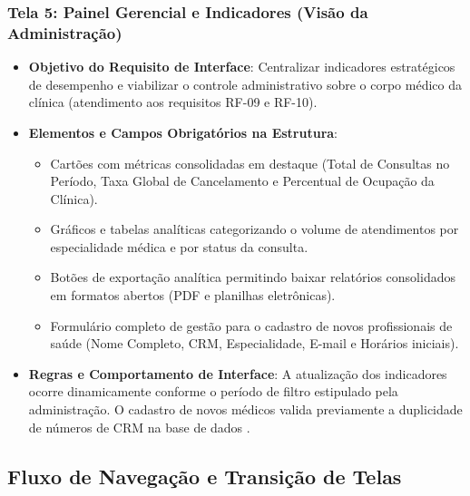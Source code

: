 \subsubsection{Tela 5: Painel Gerencial e Indicadores (Visão da Administração)}
\begin{itemize}
    \item \textbf{Objetivo do Requisito de Interface}: Centralizar indicadores estratégicos de desempenho e viabilizar o controle administrativo sobre o corpo médico da clínica (atendimento aos requisitos RF-09 e RF-10).
    \item \textbf{Elementos e Campos Obrigatórios na Estrutura}:
    \begin{itemize}
        \item Cartões com métricas consolidadas em destaque (Total de Consultas no Período, Taxa Global de Cancelamento e Percentual de Ocupação da Clínica).
        \item Gráficos e tabelas analíticas categorizando o volume de atendimentos por especialidade médica e por status da consulta.
        \item Botões de exportação analítica permitindo baixar relatórios consolidados em formatos abertos (PDF e planilhas eletrônicas).
        \item Formulário completo de gestão para o cadastro de novos profissionais de saúde (Nome Completo, CRM, Especialidade, E-mail e Horários iniciais).
    \end{itemize}
    \item \textbf{Regras e Comportamento de Interface}: A atualização dos indicadores ocorre dinamicamente conforme o período de filtro estipulado pela administração. O cadastro de novos médicos valida previamente a duplicidade de números de CRM na base de dados \cite{nielsen1993}.
\end{itemize}

\subsection{Fluxo de Navegação e Transição de Telas}

